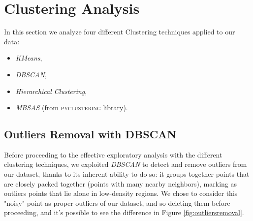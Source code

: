 \documentclass[12pt]{article}
\begin{document}

\section{Clustering Analysis}
In this section we analyze four different Clustering techniques applied to our data:
\begin{itemize}
    \item \textit{KMeans},
    \item \textit{DBSCAN},

    \item \textit{Hierarchical Clustering},
    \item \textit{MBSAS} (from \textsc{pyclustering} library).
\end{itemize}


\subsection{Outliers Removal with DBSCAN}
Before proceeding to the effective exploratory analysis with the different clustering techniques, we exploited \textit{DBSCAN} to detect and remove outliers from our dataset, thanks to its inherent ability to do so: it groups together points that are closely packed together (points with many nearby neighbors), marking as outliers points that lie alone in low-density regions. We chose to consider this "noisy" point as proper outliers of our dataset, and so deleting them before proceeding, and it's possible to see the difference in Figure \ref{fig:outliersremoval}.
\end{document}
